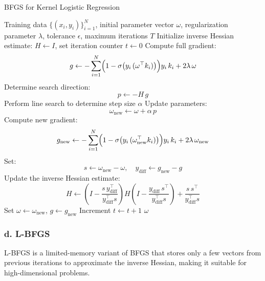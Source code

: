 \documentclass{article}
\begin{document}
\begin{algorithm}[H]
  \caption{BFGS for Kernel Logistic Regression}
  \begin{algorithmic}[1]
  \Require Training data $\{(x_i,y_i)\}_{i=1}^N$, initial parameter vector $\omega$, regularization parameter $\lambda$, tolerance $\epsilon$, maximum iterations $T$
  \State Initialize inverse Hessian estimate: $H \gets I$, set iteration counter $t \gets 0$
  \Repeat
      \State Compute full gradient:
      \[
        g \gets -\sum_{i=1}^{N} \Bigl(1-\sigma\bigl(y_i\,(\omega^\top k_i)\bigr)\Bigr)y_i\,k_i + 2\lambda\,\omega
      \]
      \State Determine search direction:
      \[
        p \gets -H\,g
      \]
      \State Perform line search to determine step size $\alpha$
      \State Update parameters: 
      \[
        \omega_{\text{new}} \gets \omega + \alpha\, p
      \]
      \State Compute new gradient:
      \[
        g_{\text{new}} \gets -\sum_{i=1}^{N} \Bigl(1-\sigma\bigl(y_i\,(\omega_{\text{new}}^\top k_i)\bigr)\Bigr)y_i\,k_i + 2\lambda\,\omega_{\text{new}}
      \]
      \State Set:
      \[
        s \gets \omega_{\text{new}} - \omega,\quad y_{\text{diff}} \gets g_{\text{new}} - g
      \]
      \State Update the inverse Hessian estimate:
      \[
        H \gets \left(I - \frac{s\,y_{\text{diff}}^\top}{y_{\text{diff}}^\top s}\right) H \left(I - \frac{y_{\text{diff}}\,s^\top}{y_{\text{diff}}^\top s}\right) + \frac{s\,s^\top}{y_{\text{diff}}^\top s}
      \]
      \State Set $\omega \gets \omega_{\text{new}}$, $g \gets g_{\text{new}}$
      \State Increment $t \gets t+1$
  \State \Return $\omega$
  \end{algorithmic}
\end{algorithm}

\subsubsection*{d. L-BFGS}

L-BFGS is a limited-memory variant of BFGS that stores only a few vectors from previous iterations to approximate the inverse Hessian, making it suitable for high-dimensional problems.
\end{document}
